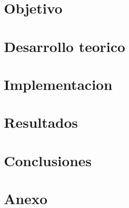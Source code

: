 


		
	
	\newpage

	\tableofcontents
	\newpage

	\graphicspath{{../docs/report/pics/}}

	\section{Objetivo}
		

	\newpage
	\section{Desarrollo teorico}
		

	\newpage
	\section{Implementacion}
		

	\newpage
	\section{Resultados}
		

	\newpage
	\section{Conclusiones}
		

	\newpage
    \section{Anexo}
        

